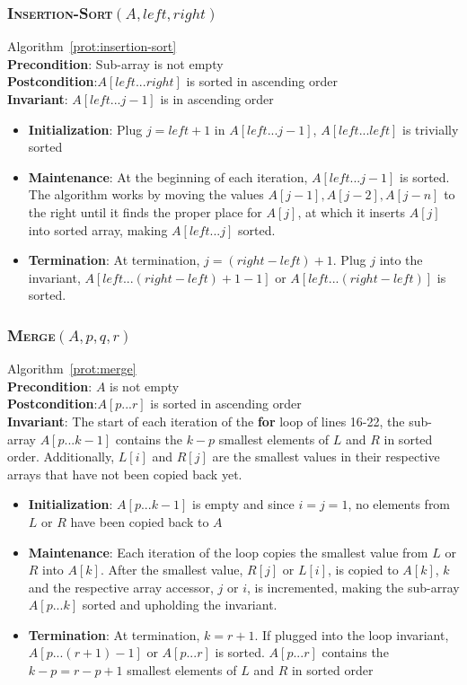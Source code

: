 \documentclass[onecolumn, letterpaper, 12pt]{article}
\begin{document}
		\subsubsection{\textsc{Insertion-Sort}$(A, left, right)$}
			\footnotesize
			Algorithm~\ref{prot:insertion-sort}\\
			\textbf{Precondition}: Sub-array is not empty\\
			\textbf{Postcondition}:$A[left...right]$ is sorted in ascending order\\
			\textbf{Invariant}: $A[left...j-1]$ is in ascending order
			\begin{itemize}
				\item \textbf{Initialization}: Plug $j=left+1$ in $A[left...j-1]$, $A[left...left]$ is trivially sorted
				\item \textbf{Maintenance}: At the beginning of each iteration, $A[left...j-1]$ is sorted. The algorithm works by moving the values $A[j-1], A[j-2], A[j-n]$ to the right until it finds the proper place for $A[j]$, at which it inserts $A[j]$ into sorted array, making $A[left...j]$ sorted.
				\item \textbf{Termination}: At termination, $j=(right-left)+1$. Plug $j$ into the invariant, $A[left...(right-left)+1-1]$ or $A[left...(right-left)]$ is sorted.
			\end{itemize}
			\normalsize
		\subsubsection{\textsc{Merge}$(A, p, q, r)$}
			\footnotesize
			Algorithm~\ref{prot:merge}\\
			\textbf{Precondition}: $A$ is not empty\\
			\textbf{Postcondition}:$A[p...r]$ is sorted in ascending order\\
			\textbf{Invariant}: The start of each iteration of the \textbf{for} loop of lines 16-22, the sub-array $A[p...k-1]$ contains the $k-p$ smallest elements of $L$ and $R$ in sorted order. Additionally, $L[i]$ and $R[j]$ are the smallest values in their respective arrays that have not been copied back yet.
			\begin{itemize}
				\item \textbf{Initialization}: $A[p...k-1]$ is empty and since $i=j=1$, no elements from $L$ or $R$ have been copied back to $A$
				\item \textbf{Maintenance}: Each iteration of the loop copies the smallest value from $L$ or $R$ into $A[k]$. After the smallest value, $R[j]$ or $L[i]$, is copied to $A[k]$, $k$ and the respective array accessor, $j$ or $i$, is incremented, making the sub-array $A[p...k]$ sorted and upholding the invariant.
				\item \textbf{Termination}: At termination, $k=r+1$. If plugged into the loop invariant, $A[p...(r+1)-1]$ or $A[p...r]$ is sorted. $A[p...r]$ contains the $k-p=r-p+1$ smallest elements of $L$ and $R$ in sorted order
			\end{itemize}
			\normalsize
\end{document}
